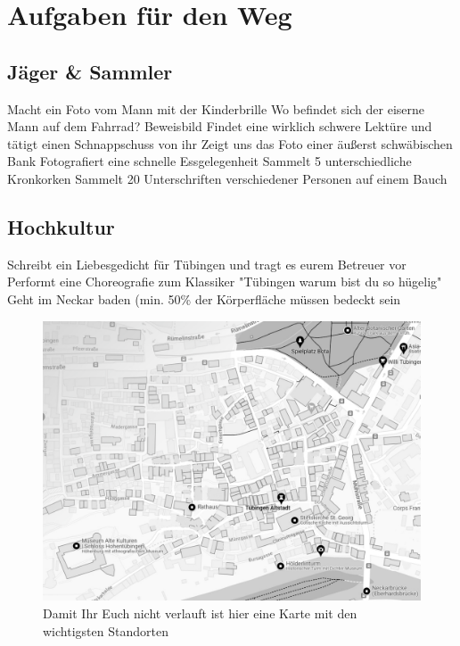 \documentclass[11pt,paper=a4,answers]{exam}
\renewenvironment{questions}{
	\begin{q}
		\pointsinrightmargin
		\marginpointname{\ Pkt}
		\bracketedpoints }{
	\end{q}}
\begin{document}
\newpage

\section*{Aufgaben für den Weg}
\subsection*{Jäger \& Sammler}
\begin{questions}
	\question[5] Macht ein Foto vom Mann mit der Kinderbrille
	\question[5] Wo befindet sich der eiserne Mann auf dem Fahrrad? Beweisbild
	\question[5] Findet eine wirklich 	schwere Lektüre und tätigt einen Schnappschuss von ihr
	\question[5] Zeigt uns das Foto einer äußerst schwäbischen Bank
	\question[je 1] Fotografiert eine schnelle Essgelegenheit
	\question[10] Sammelt 5 unterschiedliche Kronkorken
	\question[20] Sammelt 20 Unterschriften verschiedener Personen auf einem Bauch
	
\end{questions}

\subsection*{Hochkultur}
\begin{questions}
	\question[10] Schreibt ein Liebesgedicht für Tübingen und tragt es eurem Betreuer vor
	\question[20] Performt eine Choreografie zum Klassiker "Tübingen warum bist du so hügelig"
	\question[Schnupfen + 50] Geht im Neckar baden (min. 50\% der Körperfläche müssen bedeckt sein

\end{questions}
\vspace{15mm}
\begin{figure}[ht]
\includegraphics[width=\textwidth]{graphics/Karte_Stationen}
\captionsetup{labelformat=empty}
\caption{Damit Ihr Euch nicht verlauft ist hier eine Karte mit den wichtigsten Standorten}
\end{figure}
 
\end{document}
